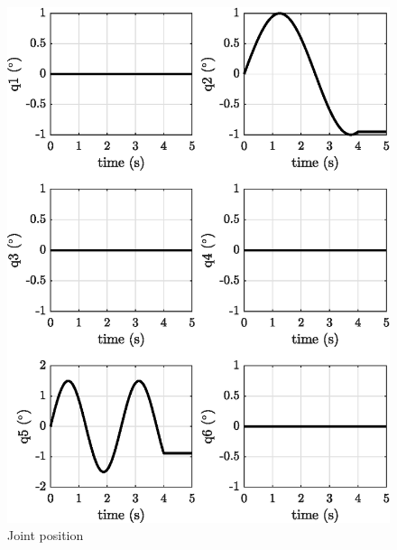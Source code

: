 \documentclass[12pt, a4paper]{article}
\begin{document}


\begin{figure}
    \centering
    \includegraphics{images/exp1.1/joint_position.eps}
    \caption{Joint position}
    \label{fig:joint_position}
\end{figure}
\end{document}
